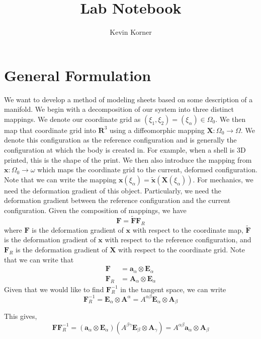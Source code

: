 \documentclass[11pt]{article}
\theoremstyle{plain}
\theoremstyle{definition}
\begin{document}
 


\title{Lab Notebook}
\author{Kevin Korner}
\maketitle


\section{General Formulation}
 We want to develop a method of modeling sheets based on some description of a manifold. We begin with a decomposition of our system into three distinct mappings. We denote our coordinate grid as $(\xi_1,\xi_2) = (\xi_\alpha) \in \Omega_0$. We then map that coordinate grid into $\mathbf{R}^3$ using a diffeomorphic mapping $\mathbf{X} : \Omega_0 \to \Omega$. We denote this configuration as the reference configuration and is generally the configuration at which the body is created in. For example, when a shell is 3D printed, this is the shape of the print. We then also introduce the mapping from $\mathbf{x} : \Omega_0 \to \omega$ which maps the coordinate grid to the current, deformed configuration. Note that we can write the mapping $\mathbf{x}(\xi_\alpha) = \tilde{\mathbf{x}}(\mathbf{X}(\xi_\alpha))$. For mechanics, we need the deformation gradient of this object. Particularly, we need the deformation gradient between the reference configuration and the current configuration. Given the composition of mappings, we have
\[
\mathbf{F} = \tilde{\mathbf{F}} \mathbf{F}_R
\]
where $\mathbf{F}$ is the deformation gradient of $\mathbf{x}$ with respect to the coordinate map, $\tilde{\mathbf{F}}$ is the deformation gradient of $\mathbf{x}$ with respect to the reference configuration, and $\mathbf{F}_R$ is the deformation gradient of $\mathbf{X}$ with respect to the coordinate grid. Note that we can write that
\[
\begin{split}
\mathbf{F} &= \mathbf{a}_\alpha \otimes \mathbf{E}_\alpha \\
\mathbf{F}_R &= \mathbf{A}_\alpha \otimes \mathbf{E}_\alpha
 \end{split}
\]
Given that we would like to find $\mathbf{F}_R^{-1}$ in the tangent space, we can write
\[
\mathbf{F}_R^{-1} = \mathbf{E}_\alpha \otimes \mathbf{A}^{\alpha} = A^{\alpha \beta} \mathbf{E}_\alpha \otimes \mathbf{A}_\beta
\]

This gives,
\[
\mathbf{F}\mathbf{F}_R^{-1} = \left(\mathbf{a}_\alpha \otimes \mathbf{E}_\alpha \right) \left(A^{\beta \gamma} \mathbf{E}_\beta \otimes \mathbf{A}_\gamma \right) = A^{\alpha \beta} \mathbf{a}_\alpha \otimes \mathbf{A}_\beta
\]
\end{document}
